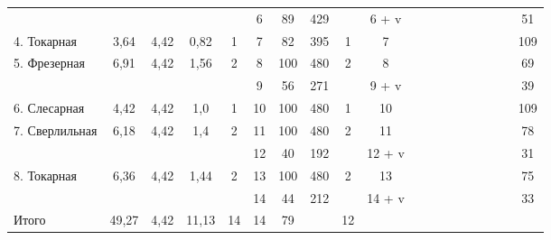 \begin{landscape}
\begin{table} [h!]
{\begin{tabular}{
      | p{2.2cm} | c | c | c | c | c | c | c | c | c 
      | m{1cm} m{1cm} m{1cm} m{1cm} m{1cm} m{1cm} m{1cm} m{1cm} 
      | c |
      }
   & & & 
   & 
   & 6 
   & 89 & 429
   & 
   & 6 + v
   & & & & & & & &
   & 51 \\ \cline{1-10}\cline{19-19}

   4. Токарная
   & 3{,}64 & 4{,}42
   & 0{,}82 & 1
   & 7 
   & 82 & 395
   & 1
   & 7
   & & & & & & & &
   & 109 \\ \cline{1-10}\cline{19-19}

   \multirow{2}{*}{5. Фрезерная} 
   & \multirow{2}{*}{6{,}91} & \multirow{2}{*}{4{,}42}
   & \multirow{2}{*}{1{,}56} & \multirow{2}{*}{2}
   & 8 
   & 100 & 480
   & \multirow{2}{*}{2}
   & 8
   & & & & & & & &
   & 69 \\

   & & & 
   & 
   & 9 
   & 56 & 271
   & 
   & 9 + v
   & & & & & & & &
   & 39 \\ \cline{1-10}\cline{19-19}

   6. Слесарная
   & 4{,}42 & 4{,}42
   & 1{,}0 & 1
   & 10 
   & 100 & 480
   & 1
   & 10
   & & & & & & & &
   & 109 \\ \cline{1-10}\cline{19-19}

   \multirow{2}{*}{7. Сверлильная} 
   & \multirow{2}{*}{6{,}18} & \multirow{2}{*}{4{,}42}
   & \multirow{2}{*}{1{,}4} & \multirow{2}{*}{2}
   & 11 
   & 100 & 480
   & \multirow{2}{*}{2}
   & 11
   & & & & & & & &
   & 78 \\

   & & & 
   & 
   & 12 
   & 40 & 192
   & 
   & 12 + v
   & & & & & & & &
   & 31 \\ \cline{1-10}\cline{19-19}

   \multirow{2}{*}{8. Токарная} 
   & \multirow{2}{*}{6{,}36} & \multirow{2}{*}{4{,}42}
   & \multirow{2}{*}{1{,}44} & \multirow{2}{*}{2}
   & 13 
   & 100 & 480
   & \multirow{2}{*}{2}
   & 13
   & & & & & & & &
   & 75 \\

   & & & 
   & 
   & 14
   & 44 & 212
   & 
   & 14 + v
   & & & & & & & &
   & 33 \\ \cline{1-10}\cline{19-19}

   Итого
   & 49{,}27 & 4{,}42
   & 11{,}13 & 14
   & 14 
   & 79 & 
   & 12
   & 
   & & & & & & & &
   & \\ \hline

    \end{tabular}
  }
\end{table}


\end{landscape}
